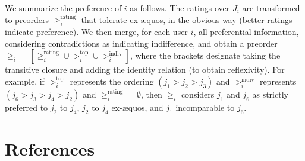 \documentclass[version=last, pagesize, twoside=off, bibliography=totoc, DIV=calc, fontsize=14pt, a4paper, french, english]{scrartcl}
\begin{document}
We summarize the preference of $i$ as follows. The ratings over $J_i$ are transformed to preorders $≥^\text{rating}_i$ that tolerate ex-æquos, in the obvious way (better ratings indicate preference). We then merge, for each user $i$, all preferential information, considering contradictions as indicating indifference, and obtain a preorder $≥_i = [≥^\text{rating}_i ∪ >^\text{top}_i ∪ >^\text{indiv}_i]$, where the brackets designate taking the transitive closure and adding the identity relation (to obtain reflexivity). For example, if $>^\text{top}_i$ represents the ordering $(j_1 > j_2 > j_3)$ and $>^\text{indiv}_i$ represents $(j_6 > j_3 > j_4 > j_2)$ and $≥^\text{rating}_i = \emptyset$, then $≥_i$ considers $j_1$ and $j_6$ as strictly preferred to $j_2$ to $j_4$, $j_2$ to $j_4$ ex-æquos, and $j_1$ incomparable to $j_6$.

\section{References}

\end{document}
